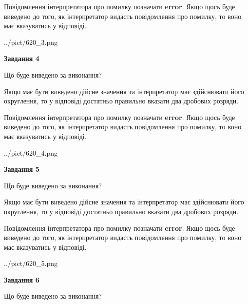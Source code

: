 \documentclass[12pt, ukrainian]{article}
\begin{document}
{\begin {Large}
Повідомлення інтерпретатора про помилку позначати \textbf{error}.
Якщо щось буде виведено до того, як інтерпретатор видасть повідомлення про помилку, 
то воно має вказуватись у відповіді. \par

\begin{center}
	{../pict/620_3.png}
\end{center}
\newpage

{\begin {center}\textbf{Завдання 4}\end {center}}\par
Що буде виведено за виконання? \par

Якщо має бути виведено дійсне значення та інтерпретатор має здійснювати його округлення, 
то у відповіді достатньо правильно вказати два дробових розряди.

Повідомлення інтерпретатора про помилку позначати \textbf{error}.
Якщо щось буде виведено до того, як інтерпретатор видасть повідомлення про помилку, 
то воно має вказуватись у відповіді. \par

\begin{center}
	{../pict/620_4.png}
\end{center}
\newpage

{\begin {center}\textbf{Завдання 5}\end {center}}\par
Що буде виведено за виконання? \par

Якщо має бути виведено дійсне значення та інтерпретатор має здійснювати його округлення, 
то у відповіді достатньо правильно вказати два дробових розряди.

Повідомлення інтерпретатора про помилку позначати \textbf{error}.
Якщо щось буде виведено до того, як інтерпретатор видасть повідомлення про помилку, 
то воно має вказуватись у відповіді. \par

\begin{center}
	{../pict/620_5.png}
\end{center}
\newpage

{\begin {center}\textbf{Завдання 6}\end {center}}\par
Що буде виведено за виконання? \par


\end{Large}}
\end{document}
